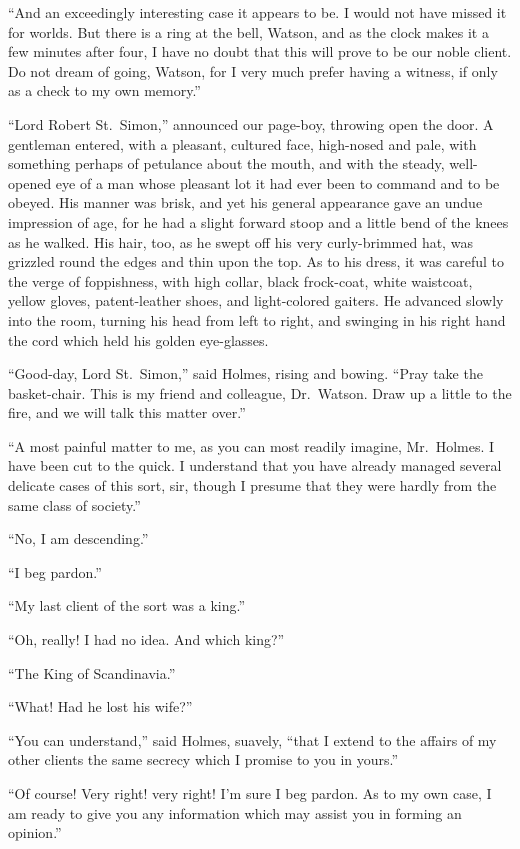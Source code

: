 “And an exceedingly interesting case it appears to be. I
would not have missed it for worlds. But there is a ring at
the bell, Watson, and as the clock makes it a few minutes
after four, I have no doubt that this will prove to be our noble
client. Do not dream of going, Watson, for I very much prefer
having a witness, if only as a check to my own memory.”

“Lord Robert St.~Simon,” announced our page-boy, throwing
open the door. A gentleman entered, with a pleasant,
cultured face, high-nosed and pale, with something perhaps
of petulance about the mouth, and with the steady, well-opened
eye of a man whose pleasant lot it had ever been to command
and to be obeyed. His manner was brisk, and yet his
general appearance gave an undue impression of age, for he
had a slight forward stoop and a little bend of the knees as
he walked. His hair, too, as he swept off his very curly-brimmed
hat, was grizzled round the edges and thin upon the top.
As to his dress, it was careful to the verge of foppishness,
with high collar, black frock-coat, white waistcoat, yellow
gloves, patent-leather shoes, and light-colored gaiters. He
advanced slowly into the room, turning his head from left to
right, and swinging in his right hand the cord which held his
golden eye-glasses.

“Good-day, Lord St.~Simon,” said Holmes, rising and bowing.
“Pray take the basket-chair. This is my friend and
colleague, Dr.\ Watson. Draw up a little to the fire, and we
will talk this matter over.”

“A most painful matter to me, as you can most readily
imagine, Mr.~Holmes. I have been cut to the quick. I understand
that you have already managed several delicate cases
of this sort, sir, though I presume that they were hardly from
the same class of society.”

“No, I am descending.”

“I beg pardon.”

“My last client of the sort was a king.”

“Oh, really! I had no idea. And which king?”

“The King of Scandinavia.”

“What! Had he lost his wife?”

“You can understand,” said Holmes, suavely, “that I extend
to the affairs of my other clients the same secrecy which
I promise to you in yours.”

“Of course! Very right! very right! I’m sure I beg pardon.
As to my own case, I am ready to give you any information
which may assist you in forming an opinion.”

